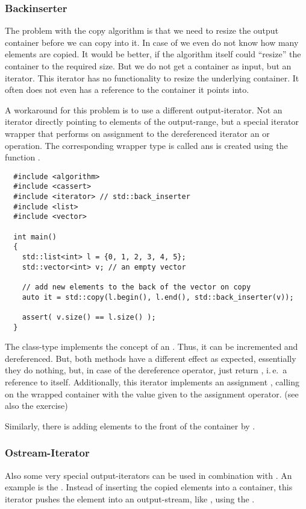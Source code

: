 \subsubsection{Backinserter}
The problem with the copy algorithm is that we need to resize the output container before we can copy into it. In case of  we even do
not know how many elements are copied. It would be better, if the algorithm itself could ``resize'' the container to the required size. But we
do not get a container as input, but an iterator. This iterator has no functionality to resize the underlying container. It often does not even has
a reference to the container it points into.

A workaround for this problem is to use a different output-iterator. Not an iterator directly pointing to elements of the output-range, but a special
iterator wrapper that performs on assignment to the dereferenced iterator an  or  operation. The corresponding
wrapper type is called  ans is created using the function .
%
\begin{verbatim}
  #include <algorithm>
  #include <cassert>
  #include <iterator> // std::back_inserter
  #include <list>
  #include <vector>

  int main()
  {
    std::list<int> l = {0, 1, 2, 3, 4, 5};
    std::vector<int> v; // an empty vector

    // add new elements to the back of the vector on copy
    auto it = std::copy(l.begin(), l.end(), std::back_inserter(v));

    assert( v.size() == l.size() );
  }
\end{verbatim}

The class-type  implements the concept of an . Thus, it can be incremented and dereferenced. But, both
methods have a different effect as expected, essentially they do nothing, but, in case of the dereference operator, just return , i.\,e.\ a reference
to itself. Additionally, this iterator implements an assignment , calling  on the wrapped container with the
value given to the assignment operator. (see also the exercise)

Similarly, there is  adding elements to the front of the container by .


\subsubsection{Ostream-Iterator}
Also some very special output-iterators can be used in combination with . An example is the . Instead of
inserting the copied elements into a container, this iterator pushes the element into an output-stream, like , using the .


